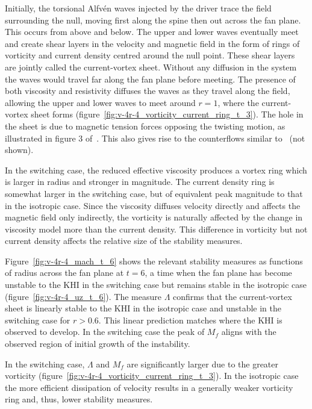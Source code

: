 Initially, the torsional Alfv\'en waves injected by the driver trace the field surrounding the null, moving first along the spine then out across the fan plane. This occurs from above and below. The upper and lower waves eventually meet and create shear layers in the velocity and magnetic field in the form of rings of vorticity and current density centred around the null point. These shear layers are jointly called the current-vortex sheet. Without any diffusion in the system the waves would travel far along the fan plane before meeting. The presence of both viscosity and resistivity diffuses the waves as they travel along the field, allowing the upper and lower waves to meet around $r=1$, where the current-vortex sheet forms  (figure~\ref{fig:v-4r-4_vorticity_current_ring_t_3}). The hole in the sheet is due to magnetic tension forces opposing the twisting motion, as illustrated in figure 3 of~\cite{wyperKelvinHelmholtzInstabilityCurrentvortex2013}. This also gives rise to the counterflows similar to~\cite{wyperKelvinHelmholtzInstabilityCurrentvortex2013,galsgaardNumericalExperimentsWave2003} (not shown).

In the switching case, the reduced effective viscosity produces a vortex ring which is larger in radius and stronger in magnitude. The current density ring is somewhat larger in the switching case, but of equivalent peak magnitude to that in the isotropic case. Since the viscosity diffuses velocity directly and affects the magnetic field only indirectly, the vorticity is naturally affected by the change in viscosity model more than the current density. This difference in vorticity but not current density affects the relative size of the stability measures.

Figure~\ref{fig:v-4r-4_mach_t_6} shows the relevant stability measures as functions of radius across the fan plane at $t=6$, a time when the fan plane has become unstable to the KHI in the switching case but remains stable in the isotropic case (figure~\ref{fig:v-4r-4_uz_t_6}). The measure $\Lambda$ confirms that the current-vortex sheet is linearly stable to the KHI in the isotropic case and unstable in the switching case for $r>0.6$. This linear prediction matches where the KHI is observed to develop. In the switching case the peak of $M_f$ aligns with the observed region of initial growth of the instability.

In the switching case, $\Lambda$ and $M_f$ are significantly larger due to the greater vorticity (figure~\ref{fig:v-4r-4_vorticity_current_ring_t_3}). In the isotropic case the more efficient dissipation of velocity results in a generally weaker vorticity ring and, thus, lower stability measures.

